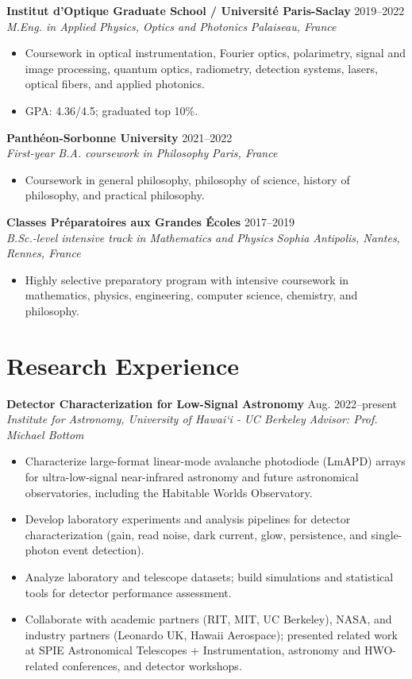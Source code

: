 \documentclass[11pt,letterpaper]{article}
\newcommand{\cvheading}[4]{%
  \textbf{#1} \hfill #2\\
  \textit{#3} \hfill \textit{#4}\par
}
\begin{document}
\cvheading{Institut d'Optique Graduate School / Universit\'e Paris-Saclay}{2019--2022}{M.Eng. in Applied Physics, Optics and Photonics}{Palaiseau, France}
\begin{itemize}
  \item Coursework in optical instrumentation, Fourier optics, polarimetry, signal and image processing, quantum optics, radiometry, detection systems, lasers, optical fibers, and applied photonics.
  \item GPA: 4.36/4.5; graduated top 10\%.
\end{itemize}

\cvheading{Panthéon-Sorbonne University}{2021--2022}{First-year B.A. coursework in Philosophy}{Paris, France}
\begin{itemize}
  \item Coursework in general philosophy, philosophy of science, history of philosophy, and practical philosophy.
\end{itemize}

\cvheading{Classes Pr\'eparatoires aux Grandes \'Ecoles}{2017--2019}{B.Sc.-level intensive track in Mathematics and Physics}{Sophia Antipolis, Nantes, Rennes, France}
\begin{itemize}
  \item Highly selective preparatory program with intensive coursework in mathematics, physics, engineering, computer science, chemistry, and philosophy.
\end{itemize}









\section{Research Experience}

\cvheading{Detector Characterization for Low-Signal Astronomy}{Aug. 2022--present}{Institute for Astronomy, University of Hawai`i - UC Berkeley}{Advisor: Prof. Michael Bottom}
\begin{itemize}
  \item Characterize large-format linear-mode avalanche photodiode (LmAPD) arrays for ultra-low-signal near-infrared astronomy and future astronomical observatories, including the Habitable Worlds Observatory.
  \item Develop laboratory experiments and analysis pipelines for detector characterization (gain, read noise, dark current, glow, persistence, and single-photon event detection).
  \item Analyze laboratory and telescope datasets; build simulations and statistical tools for detector performance assessment.
  \item Collaborate with academic partners (RIT, MIT, UC Berkeley), NASA, and industry partners (Leonardo UK, Hawaii Aerospace); presented related work at SPIE Astronomical Telescopes + Instrumentation, astronomy and HWO-related conferences, and detector workshops.
\end{itemize}
\end{document}
